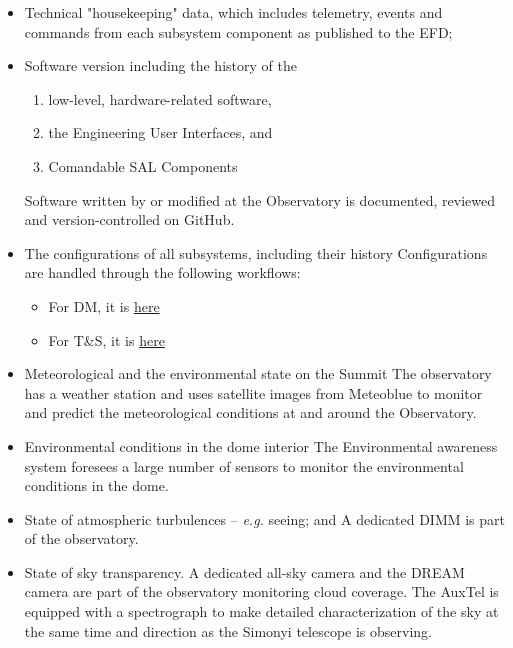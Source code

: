 \begin{itemize}
	\item Technical "housekeeping" data, which includes telemetry, events and commands from each subsystem component as published to the EFD;

	\item Software version including the history of the
	\begin{enumerate}
		\item low-level, hardware-related software,
		\item the Engineering User Interfaces, and
		\item Comandable SAL Components
	\end{enumerate}
	Software written by or modified at the Observatory is documented, reviewed and version-controlled on GitHub.
	\item The configurations of all subsystems, including their history
	Configurations are handled through the following workflows:
	\begin{itemize}
		\item For DM, it is \href{https://developer.lsst.io/work/flow.html}{here}
		\item For T\&S, it is \href{https://tssw-developer.lsst.io/work_management/development_workflow.html#development-workflow}{here}
	\end{itemize}

	\item Meteorological and the environmental state on the Summit
	The observatory has a weather station and uses satellite images from Meteoblue to monitor and predict the meteorological conditions at and around the Observatory.

	\item Environmental conditions in the dome interior
	The Environmental awareness system foresees a large number of sensors to monitor the environmental conditions in the dome.

	\item State of atmospheric turbulences -- {\it e.g.} seeing; and
	A dedicated DIMM is part of the observatory.

	\item State of sky transparency.
	A dedicated all-sky camera and the DREAM camera are part of the observatory monitoring cloud coverage.
	The AuxTel is equipped with a spectrograph to make detailed characterization of the sky at the same time and direction as the Simonyi telescope is observing.

\end{itemize}

